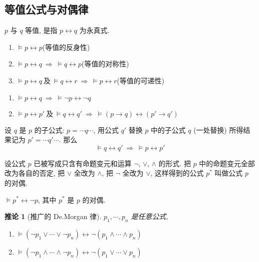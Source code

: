 \documentclass[
    mode=hazy,
    color=blue,
    device=normal,
    lang=cn
]{elegantnote}
\newtheorem{deduction}{推论}[section]
\begin{document}
\subsection{等值公式与对偶律}
\begin{definition}[等值公式]
    $p$ 与 $q$ 等值, 是指 $p\leftrightarrow q$ 为永真式.
\end{definition}
\begin{proposition}
    \hfill
    \begin{enumerate}[label = $\arabic*^\circ$, topsep = -1em]
        \item $\vDash p \leftrightarrow p$\hfill (等值的反身性)
        \item $\vDash p \leftrightarrow q \ \Rightarrow\ \vDash q\leftrightarrow p$\hfill (等值的对称性)
        \item $\vDash p \leftrightarrow q\ \text{及}\ \vDash q \leftrightarrow r\ \Rightarrow\ \vDash p \leftrightarrow r$\hfill (等值的可递性)
    \end{enumerate}
\end{proposition}
\begin{proposition}
    \hfill
    \begin{enumerate}[label = $\arabic*^\circ$, topsep = -1em]
        \item $\vDash p\leftrightarrow q\ \Rightarrow\ \vDash\lnot p\leftrightarrow \lnot q$
        \item $\vDash p\leftrightarrow p'\ \text{及}\ \vDash q\leftrightarrow q'\ \Rightarrow\ \vDash(p\to q)\leftrightarrow(p'\to q')$
    \end{enumerate}
\end{proposition}
\begin{theorem}[子公式等值可替换性]
    设 $q$ 是 $p$ 的子公式: $p=\cdots q\cdots$, 用公式 $q'$ 替换 $p$ 中的子公式 $q$ (一处替换) 所得结果记为 $p'=\cdots q'\cdots$. 那么
    $$
        \vDash q\leftrightarrow q'\ \Rightarrow\ \vDash p\leftrightarrow p'
    $$
\end{theorem}
\begin{definition}[公式的对偶]
    设公式 $p$ 已被写成只含有命题变元和运算 $\lnot$, $\lor$, $\land$ 的形式. 把 $p$ 中的命题变元全部改为各自的否定, 把 $\lor$ 全改为 $\land$, 把 $\lnot$ 全改为 $\lor$, 这样得到的公式 $p^*$ 叫做公式 $p$ 的对偶.
\end{definition}
\begin{theorem}[对偶律]
    $\vDash p^*\leftrightarrow \lnot p$, 其中 $p^*$ 是 $p$ 的对偶.
\end{theorem}
\begin{deduction}[推广的 De.Morgan 律]
    $p_1,\cdots,p_n$ 是任意公式,
    \begin{enumerate}[label = $\arabic*^\circ$, topsep = -1em]
        \item $\vDash (\lnot p_1\lor\cdots\lor\lnot p_n)\leftrightarrow\lnot (p_1\land\cdots\land p_n)$
        \item $\vDash (\lnot p_1\land\cdots\land\lnot p_n)\leftrightarrow\lnot (p_1\lor\cdots\lor p_n)$
    \end{enumerate}
\end{deduction}
\end{document}
